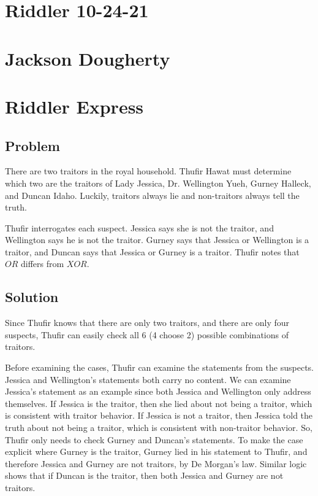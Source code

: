 \documentclass[reqno]{amsart}
\begin{document}
\section*{Riddler 10-24-21}
\section*{Jackson Dougherty}

\section{Riddler Express}

\subsection*{Problem}

There are two traitors in the royal household. Thufir Hawat must determine which two are the traitors of Lady Jessica, Dr. Wellington Yueh, Gurney Halleck, and Duncan Idaho. Luckily, traitors always lie and non-traitors always tell the truth.

Thufir interrogates each suspect. Jessica says she is not the traitor, and Wellington says he is not the traitor. Gurney says that Jessica or Wellington is a traitor, and Duncan says that Jessica or Gurney is a traitor. Thufir notes that $OR$ differs from $XOR$.  

\subsection*{Solution}

Since Thufir knows that there are only two traitors, and there are only four suspects, Thufir can easily check all 6 (4 choose 2) possible combinations of traitors. 

Before examining the cases, Thufir can examine the statements from the suspects. Jessica and Wellington's statements both carry no content. We can examine Jessica's statement as an example since both Jessica and Wellington only address themselves. If Jessica is the traitor, then she lied about not being a traitor, which is consistent with traitor behavior. If Jessica is not a traitor, then Jessica told the truth about not being a traitor, which is consistent with non-traitor behavior. So, Thufir only needs to check Gurney and Duncan's statements. To make the case explicit where Gurney is the traitor, Gurney lied in his statement to Thufir, and therefore Jessica and Gurney are not traitors, by De Morgan's law. Similar logic shows that if Duncan is the traitor, then both Jessica and Gurney are not traitors.
\end{document}
